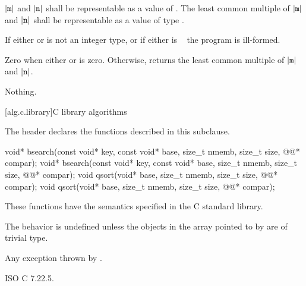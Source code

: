 \begin{itemdescr}
\pnum
\requires
$|\texttt{m}|$ and $|\texttt{n}|$ shall
be representable as a value of .
The least common multiple of $|\texttt{m}|$ and $|\texttt{n}|$
shall be representable as a value of type .

\pnum
\remarks
If either  or  is not an integer type, or
if either is \cv{}~ the program is ill-formed.

\pnum
\returns
Zero when either  or  is zero.
Otherwise, returns the least common multiple of $|\texttt{m}|$ and $|\texttt{n}|$.

\pnum
\throws
Nothing.
\end{itemdescr}

[alg.c.library]{C library algorithms}

\pnum
{}%
\begin{note}
The header 
declares the functions described in this subclause.
\end{note}

%
%
\begin{itemdecl}
void* bsearch(const void* key, const void* base, size_t nmemb, size_t size,
              @@* compar);
void* bsearch(const void* key, const void* base, size_t nmemb, size_t size,
              @@* compar);
void qsort(void* base, size_t nmemb, size_t size, @@* compar);
void qsort(void* base, size_t nmemb, size_t size, @@* compar);
\end{itemdecl}

\begin{itemdescr}
\pnum
\effects
These functions have the semantics specified in the C standard library.

\pnum
\remarks
The behavior is undefined
unless the objects in the array pointed to by 
are of trivial type.

\pnum
\throws
Any exception thrown by .
\end{itemdescr}

\xref
ISO C 7.22.5.
